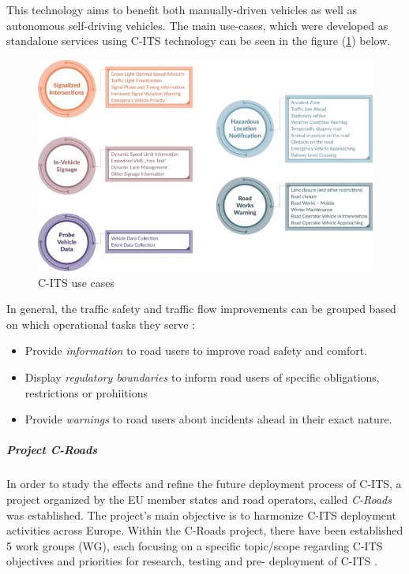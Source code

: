 \documentclass[main.tex]{subfiles}
\begin{document}
This technology aims to benefit both manually-driven vehicles 
as well as autonomous self-driving vehicles. The main use-cases, which were developed as
standalone services using C-ITS technology can be seen in the figure (\ref{c-its-use-case})
below.

\begin{figure}[htbp]
    \centering
    \includegraphics[width=.8\textwidth]{c-its-kolecka.png}
    \caption{C-ITS use cases \cite{2022}}
    \label{c-its-use-case}
\end{figure}

In general, the traffic safety and traffic flow improvements can be grouped based on which 
operational tasks they serve \cite{CRoads2021}: 

\begin{itemize}
    \item Provide \emph{information} to road users to improve road safety and comfort.
    \item Display \emph{regulatory boundaries} to inform road users of specific obligations, 
    restrictions or prohiitions
    \item Provide \emph{warnings} to road users about incidents ahead in their exact nature. 
\end{itemize}

\subparagraph{Project C-Roads}

In order to study the effects and refine the future deployment process of C-ITS, a project 
organized by the EU member states and road operators, called \emph{C-Roads} was established. 
The project's main objective is to harmonize C-ITS deployment activities across Europe. 
Within the C-Roads project, there have been established 5 work groups (WG), each focusing on a 
specific topic/scope regarding C-ITS objectives and priorities for research, testing and pre-
deployment of C-ITS \cite{Commision2021}. 
\end{document}
